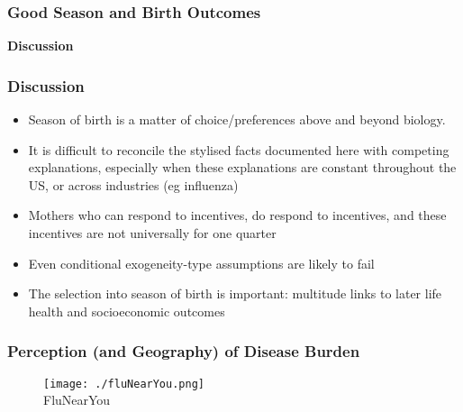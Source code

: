 \documentclass[10pt,letterpaper,subeqn]{beamer}
\begin{document}

\begin{frame}
\frametitle{Good Season and Birth Outcomes}

\end{frame}


\begin{frame}
  \begin{center}
    \textbf{Discussion}
  \end{center}
\end{frame}

\begin{frame}
\frametitle{Discussion}
\begin{itemize}
\item Season of birth is a matter of choice/preferences above and beyond biology.
\item It is difficult to reconcile the stylised facts documented here with competing explanations, especially when these explanations are constant throughout the US, or across industries (eg influenza)
\item Mothers who can respond to incentives, do respond to incentives, and these incentives are not universally for one quarter
\item Even conditional exogeneity-type assumptions are likely to fail
\item The selection into season of birth is important: multitude links to later life health and socioeconomic outcomes
\end{itemize}
\end{frame}

\begin{frame}[label=flu]
\frametitle{Perception (and Geography) of Disease Burden}
\begin{figure}[htpb!]
  \centering
  \texttt{[image: ./fluNearYou.png]} \\
{\footnotesize FluNearYou}
\end{figure}
\end{frame}
\end{document}
